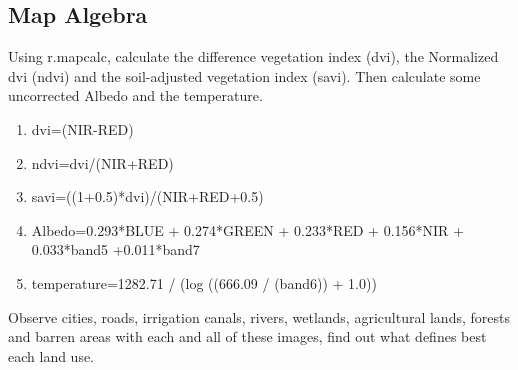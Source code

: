 \subsection{Map Algebra}
\label{map_algebra}

Using r.mapcalc, calculate the difference vegetation index (dvi), the Normalized dvi (ndvi) and the soil-adjusted vegetation index (savi). Then calculate some uncorrected Albedo and the temperature.

\begin{enumerate}
 \item dvi=(NIR-RED)
 \item ndvi=dvi/(NIR+RED)
 \item savi=((1+0.5)*dvi)/(NIR+RED+0.5)
 \item Albedo=0.293*BLUE + 0.274*GREEN + 0.233*RED + 0.156*NIR + 0.033*band5 +0.011*band7
 \item temperature=1282.71 / (log ((666.09 / (band6)) + 1.0))
\end{enumerate}

Observe cities, roads, irrigation canals, rivers, wetlands, agricultural lands, forests and barren areas with each and all of these images, find out what defines best each land use.




